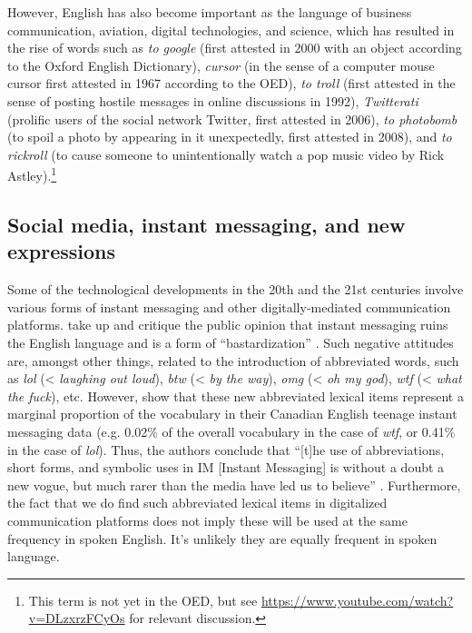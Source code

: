 However, English has also become important as the language of business communication, aviation, digital technologies, and science, which has resulted in the rise of words such as \emph{to google} (first attested in 2000 with an object according to the Oxford English Dictionary), \emph{cursor} (in the sense of a computer mouse cursor first attested in 1967 according to the OED), \emph{to troll} (first attested in the sense of posting hostile messages in online discussions in 1992), \emph{Twitterati} (prolific users of the social network Twitter, first attested in 2006), \emph{to photobomb} (to spoil a photo by appearing in it unexpectedly, first attested in 2008), and \emph{to rickroll} (to cause someone to unintentionally watch a pop music video by Rick Astley).\footnote{This term is not yet in the OED, but see \url{https://www.youtube.com/watch?v=DLzxrzFCyOs} for relevant discussion.}

\subsection{Social media, instant messaging, and new expressions}
Some of the technological developments in the 20th and the 21st centuries involve various forms of instant messaging and other digitally-mediated communication platforms. \citet{TagliamonteDenis2008} take up and critique the public opinion that instant messaging ruins the English language and is a form of ``bastardization'' \citeyearpar[4]{TagliamonteDenis2008}. Such negative attitudes are, amongst other things, related to the introduction of abbreviated words, such as \emph{lol} (< \emph{laughing out loud}), \emph{btw} (< \emph{by the way}), \emph{omg} (< \emph{oh my god}), \emph{wtf} (< \emph{what the fuck}), etc. However, \citet{TagliamonteDenis2008} show that these new abbreviated lexical items represent a marginal proportion of the vocabulary in their Canadian English teenage instant messaging data (e.g. 0.02\% of the overall vocabulary in the case of \emph{wtf}, or 0.41\% in the case of \emph{lol}). Thus, the authors conclude that ``[t]he use of abbreviations, short forms, and symbolic uses in IM [Instant Messaging] is without a doubt a new vogue, but much rarer than the media have led us to believe'' \citep[12]{TagliamonteDenis2008}. Furthermore, the fact that we do find such abbreviated lexical items in digitalized communication platforms does not imply these will be used at the same frequency in spoken English. It's unlikely they are equally frequent in spoken language.

